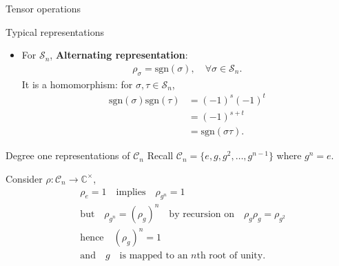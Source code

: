 \documentclass[handout,  12pt]{beamer}
\newcommand{\CC}{\mathbb{C}}
\newcommand{\1}{\mathbf{1}}
\newcommand{\0}{\mathbf{0}}
\newcommand{\Sym}{\mathcal{S}} %
\newcommand{\Cyc}{\mathcal{C}}%
\newcommand{\sgn}{\text{sgn}}
\begin{document}
\begin{frame}{Tensor operations}
\begin{frame}{Typical representations}
\begin{itemize}
			\item For $\Sym_n$, \textbf{Alternating representation}:
			\begin{align*}
				\rho_\sigma = \sgn(\sigma), \quad \forall \sigma \in \Sym_n.
			\end{align*}
			It is a homomorphism: for $\sigma, \tau \in \Sym_n$,
			\begin{align*}
				\sgn(\sigma)\sgn(\tau) &= (-1)^s(-1)^t \\
				&= (-1)^{s+t} \\
				&= \sgn(\sigma\tau).
			\end{align*}
		\end{itemize}
	\end{frame}
	
	\begin{frame}{Degree one representations of $\Cyc_n$}
		Recall $\Cyc_n = \{e, g, g^2, \dots, g^{n-1}\}$ where $g^n = e$.
		
		Consider $\rho: \Cyc_n \rightarrow \CC^\times$,
		\begin{align*}
			&\rho_e = 1 \quad \text{implies} \quad \rho_{g^n} = 1 \\
			&\text{but} \quad \rho_{g^n} = (\rho_g)^n \quad \text{by recursion on} \quad \rho_g\rho_g = \rho_{g^2} \\
			&\text{hence} \quad (\rho_g)^n = 1 \\
			&\text{and} \quad g \quad \text{is mapped to an $n$th root of unity.}
		\end{align*}
	\end{frame}
	

\end{frame}
\end{document}
